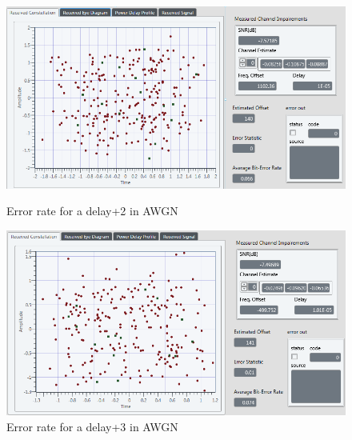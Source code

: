 \documentclass[frenchb, oneside, headings=normal]{scrartcl}
\begin{document}
\begin{figure}[!ht]
    \begin{minipage}[b]{0.48\linewidth}
        \centering \includegraphics[scale=0.45]{img/Sliding_correletaion_OFF_AWGN_5dB_shift_bit_2.png}
     \caption{Error rate for a delay+2 in AWGN}
     \label{fig3}
    \end{minipage}\hfill
    \begin{minipage}[b]{0.48\linewidth}
         \centering \includegraphics[scale=0.45]{img/Sliding_correletaion_OFF_AWGN_5dB_shift_bit_3.PNG}
          \caption{Error rate for a delay+3 in AWGN}
          \label{fig4}
    \end{minipage}  

\end{figure}
\end{document}
